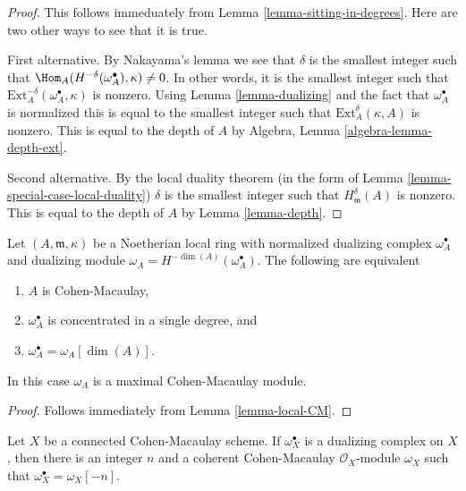 \begin{proof}
This follows immeduately from Lemma \ref{lemma-sitting-in-degrees}.
Here are two other ways to see that it is true.

\medskip\noindent
First alternative. By Nakayama's lemma we see that
$\delta$ is the smallest integer such that
$\Hom_A(H^{-\delta}(\omega_A^\bullet), \kappa) \not = 0$.
In other words, it is the smallest integer such that
$\text{Ext}_A^{-\delta}(\omega_A^\bullet, \kappa)$
is nonzero. Using Lemma \ref{lemma-dualizing} and the fact that
$\omega_A^\bullet$ is normalized this is equal to the
smallest integer such that $\text{Ext}_A^\delta(\kappa, A)$ is
nonzero. This is equal to the depth of $A$ by
Algebra, Lemma \ref{algebra-lemma-depth-ext}.

\medskip\noindent
Second alternative. By the local duality theorem
(in the form of Lemma \ref{lemma-special-case-local-duality})
$\delta$ is the smallest integer such that $H^\delta_\mathfrak m(A)$
is nonzero. This is equal to the depth of $A$ by
Lemma \ref{lemma-depth}.
\end{proof}

\begin{lemma}
\label{lemma-apply-CM}
Let $(A, \mathfrak m, \kappa)$ be a Noetherian local ring
with normalized dualizing complex $\omega_A^\bullet$
and dualizing module $\omega_A = H^{-\dim(A)}(\omega_A^\bullet)$.
The following are equivalent
\begin{enumerate}
\item $A$ is Cohen-Macaulay,
\item $\omega_A^\bullet$ is concentrated in a single degree, and
\item $\omega_A^\bullet = \omega_A[\dim(A)]$.
\end{enumerate}
In this case $\omega_A$ is a maximal Cohen-Macaulay module.
\end{lemma}

\begin{proof}
Follows immediately from Lemma \ref{lemma-local-CM}.
\end{proof}

\begin{lemma}
\label{lemma-dualizing-module-CM-scheme}
Let $X$ be a connected Cohen-Macaulay scheme. If $\omega_X^\bullet$
is a dualizing complex on $X$, then there is an integer $n$
and a coherent Cohen-Macaulay $\mathcal{O}_X$-module $\omega_X$
such that $\omega_X^\bullet = \omega_X[-n]$.
\end{lemma}

